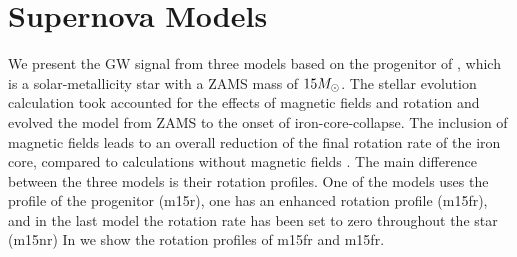 \section{Supernova Models}
We present the GW signal from three models based on the progenitor of
\cite{heger_05}, which is a solar-metallicity star with a ZAMS mass of $15 {M_\odot}$.
The stellar evolution calculation took accounted for the effects of magnetic fields and rotation and
evolved the model from ZAMS to the onset of iron-core-collapse. The inclusion of magnetic fields leads to an overall
reduction of the final rotation rate of the iron core, compared to calculations without magnetic
fields \citep{heger_05}. 
The main difference between the three models is their rotation profiles. One of the models
uses the profile of the progenitor (m15r), one has an enhanced rotation profile (m15fr), 
and in the last model the rotation rate has been set to zero throughout the star (m15nr)
In  we show the rotation profiles of m15fr and m15fr.
